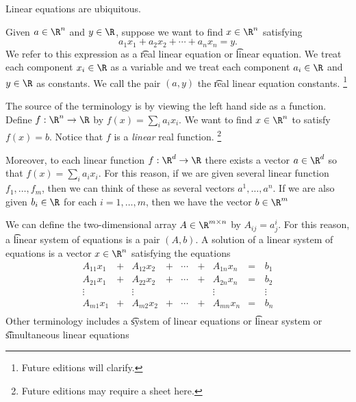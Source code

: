 
Linear equations are ubiquitous.


Given $a \in \R^n$ and $y \in \R$, suppose we want to find $x \in \R^n$ satisfying
  \[
a_1x_1 + a_2x_2 + \cdots + a_nx_n = y.
  \]
We refer to this expression as a \t{real linear equation} or \t{linear equation}.
We treat each component $x_i \in \R$ as a variable and we treat each component $a_i \in \R$ and $y \in \R$ as constants.
We call the pair $(a, y)$ the \t{real linear equation constants}.
  \ifhmode\unskip\fi\footnote{
Future editions will clarify.
  }

The source of the terminology  is by viewing the left hand side as a function.
Define $f: \R^n \to \R$ by $f(x) = \sum_{i}a_ix_i$.
We want to find $x \in \R^n$ to satisfy $f(x) = b$.
Notice that $f$ is a \textit{linear} real function.
  \ifhmode\unskip\fi\footnote{
Future editions may require a sheet here.
  }

Moreover, to each linear function $f: \R^d \to \R$ there exists a vector $a \in \R^d$ so that $f(x) = \sum_{i} a_ix_i$.
For this reason, if we are given several linear function $f_1, \dots, f_m$, then we can think of these as several vectors $a^1, \dots, a^n$.
If we are also given $b_i \in \R$ for each $i = 1, \dots, m$, then we have the vector $b \in \R^m$

We can define the two-dimensional array $A \in \R^{m \times n}$ by $A_{ij} = a^{i}_j$.
For this reason, a \t{linear system of equations} is a pair $(A, b)$.
A solution of a linear system of equations is a vector $x \in \R^n$ satisfying the equations
  \[
\begin{aligned}
A_{11}x_1 & + & A_{12}x_2 & + & \cdots \, & + & A_{1n}x_n & = \, & b_1 \\
A_{21}x_1 & + & A_{22}x_2 & + & \cdots & + & A_{2n}x_n & = & b_2 \\
\vdots & & \vdots & & & & \vdots & & \vdots \\
A_{m1}x_1 & + & A_{m2}x_2 & + & \cdots & + & A_{mn}x_n & = & b_n \\
\end{aligned}
  \]
Other terminology includes a \t{system of linear equations} or \t{linear system} or \t{simultaneous linear equations}

\blankpage
